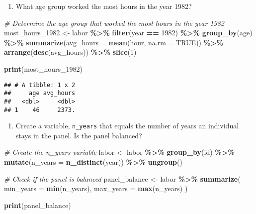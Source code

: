 \documentclass[
]{article}
\newenvironment{Shaded}{\begin{snugshade}}{\end{snugshade}}
\newcommand{\AttributeTok}[1]{\textcolor[rgb]{0.13,0.29,0.53}{#1}}
\newcommand{\CommentTok}[1]{\textcolor[rgb]{0.56,0.35,0.01}{\textit{#1}}}
\newcommand{\ConstantTok}[1]{\textcolor[rgb]{0.56,0.35,0.01}{#1}}
\newcommand{\DecValTok}[1]{\textcolor[rgb]{0.00,0.00,0.81}{#1}}
\newcommand{\FunctionTok}[1]{\textcolor[rgb]{0.13,0.29,0.53}{\textbf{#1}}}
\newcommand{\NormalTok}[1]{#1}
\newcommand{\OtherTok}[1]{\textcolor[rgb]{0.56,0.35,0.01}{#1}}
\newcommand{\SpecialCharTok}[1]{\textcolor[rgb]{0.81,0.36,0.00}{\textbf{#1}}}
\providecommand{\tightlist}{%
  \setlength{\itemsep}{0pt}\setlength{\parskip}{0pt}}
\begin{document}
\begin{enumerate}
\def\labelenumi{\alph{enumi}.}
\setcounter{enumi}{1}
\tightlist
\item
  What age group worked the most hours in the year 1982?
\end{enumerate}

\begin{Shaded}
\begin{Highlighting}[]
\CommentTok{\# Determine the age group that worked the most hours in the year 1982}
\NormalTok{most\_hours\_1982 }\OtherTok{\textless{}{-}}\NormalTok{ labor }\SpecialCharTok{\%\textgreater{}\%}
  \FunctionTok{filter}\NormalTok{(year }\SpecialCharTok{==} \DecValTok{1982}\NormalTok{) }\SpecialCharTok{\%\textgreater{}\%}
  \FunctionTok{group\_by}\NormalTok{(age) }\SpecialCharTok{\%\textgreater{}\%}
  \FunctionTok{summarize}\NormalTok{(}\AttributeTok{avg\_hours =} \FunctionTok{mean}\NormalTok{(hour, }\AttributeTok{na.rm =} \ConstantTok{TRUE}\NormalTok{)) }\SpecialCharTok{\%\textgreater{}\%}
  \FunctionTok{arrange}\NormalTok{(}\FunctionTok{desc}\NormalTok{(avg\_hours)) }\SpecialCharTok{\%\textgreater{}\%}
  \FunctionTok{slice}\NormalTok{(}\DecValTok{1}\NormalTok{)}

\FunctionTok{print}\NormalTok{(most\_hours\_1982)}
\end{Highlighting}
\end{Shaded}

\begin{verbatim}
## # A tibble: 1 x 2
##     age avg_hours
##   <dbl>     <dbl>
## 1    46     2373.
\end{verbatim}

\begin{enumerate}
\def\labelenumi{\alph{enumi}.}
\setcounter{enumi}{2}
\tightlist
\item
  Create a variable, \texttt{n\_years} that equals the number of years
  an individual stays in the panel. Is the panel balanced?
\end{enumerate}

\begin{Shaded}
\begin{Highlighting}[]
\CommentTok{\# Create the n\_years variable}
\NormalTok{labor }\OtherTok{\textless{}{-}}\NormalTok{ labor }\SpecialCharTok{\%\textgreater{}\%}
  \FunctionTok{group\_by}\NormalTok{(id) }\SpecialCharTok{\%\textgreater{}\%}
  \FunctionTok{mutate}\NormalTok{(}\AttributeTok{n\_years =} \FunctionTok{n\_distinct}\NormalTok{(year)) }\SpecialCharTok{\%\textgreater{}\%}
  \FunctionTok{ungroup}\NormalTok{()}

\CommentTok{\# Check if the panel is balanced}
\NormalTok{panel\_balance }\OtherTok{\textless{}{-}}\NormalTok{ labor }\SpecialCharTok{\%\textgreater{}\%}
  \FunctionTok{summarize}\NormalTok{(}
    \AttributeTok{min\_years =} \FunctionTok{min}\NormalTok{(n\_years),}
    \AttributeTok{max\_years =} \FunctionTok{max}\NormalTok{(n\_years)}
\NormalTok{  )}

\FunctionTok{print}\NormalTok{(panel\_balance)}
\end{Highlighting}
\end{Shaded}
\end{document}
